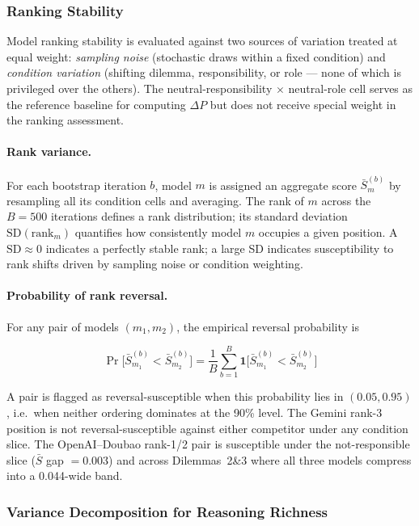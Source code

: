 \subsubsection{Ranking Stability}

Model ranking stability is evaluated against two sources of variation treated at equal
weight: \emph{sampling noise} (stochastic draws within a fixed condition) and
\emph{condition variation} (shifting dilemma, responsibility, or role --- none of which is
privileged over the others).  The neutral-responsibility $\times$ neutral-role cell serves
as the reference baseline for computing $\Delta P$ but does not receive special weight in
the ranking assessment.

\paragraph{Rank variance.}
For each bootstrap iteration $b$, model $m$ is assigned an aggregate score
$\bar{S}^{(b)}_m$ by resampling all its condition cells and averaging.  The rank of $m$
across the $B = 500$ iterations defines a rank distribution; its standard deviation
$\text{SD}(\text{rank}_m)$ quantifies how consistently model $m$ occupies a given
position.  A $\text{SD} \approx 0$ indicates a perfectly stable rank; a large SD indicates
susceptibility to rank shifts driven by sampling noise or condition weighting.

\paragraph{Probability of rank reversal.}
For any pair of models $(m_1, m_2)$, the empirical reversal probability is

\begin{equation}
    \Pr\!\bigl[\bar{S}^{(b)}_{m_1} < \bar{S}^{(b)}_{m_2}\bigr]
    = \frac{1}{B}\sum_{b=1}^{B}
      \mathbf{1}\!\bigl[\bar{S}^{(b)}_{m_1} < \bar{S}^{(b)}_{m_2}\bigr]
\end{equation}

A pair is flagged as reversal-susceptible when this probability lies in $(0.05, 0.95)$,
i.e.\ when neither ordering dominates at the 90\% level.  The Gemini rank-3 position is
not reversal-susceptible against either competitor under any condition slice.  The
OpenAI--Doubao rank-1/2 pair is susceptible under the not-responsible slice
($\bar{S}$ gap $= 0.003$) and across Dilemmas~2\&3 where all three models compress into
a 0.044-wide band.

\subsubsection{Variance Decomposition for Reasoning Richness}

